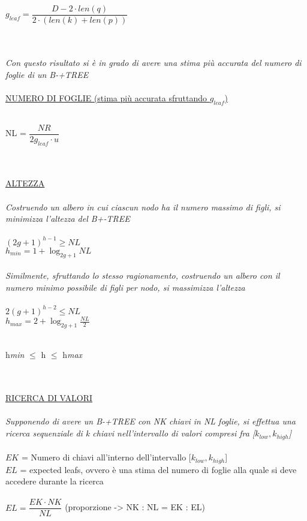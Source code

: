 \documentclass[a4paper,12pt]{article}
\begin{document}
\begin{titlepage}
	\centerline{{\Large ${ g_{leaf} = \dfrac{D - 2 \cdot len(q)}{2 \cdot (len(k) + len(p))}}$}} \\ \\
	\textit{Con questo risultato si è in grado di avere una stima più accurata del numero di foglie di un B-+TREE} \\ \\
	\underline{NUMERO DI FOGLIE (stima più accurata sfruttando ${g_{leaf}}$)} \\ \\
	\centerline{{\Large NL = ${\dfrac{NR}{2g_{leaf} \cdot u}}$}} \\ \\
	\underline{ALTEZZA} \\ \\
	\textit{Costruendo un albero in cui ciascun nodo ha il numero massimo di figli, si minimizza l'altezza del B+-TREE} \\ \\
	${(2g + 1)^{h - 1} \ge NL}$ \\
	${h_{min} = 1 + \log_{2g+1}NL}$ \\ \\
	\textit{Similmente, sfruttando lo stesso ragionamento, costruendo un albero con il numero minimo possibile di figli per nodo, si massimizza l'altezza} \\ \\
	${2(g + 1)^{h - 2} \leq NL}$ \\ 
	${h_{max} = 2 + \log_{2g+1}\tfrac{NL}{2}}$ \\ \\
	\centerline{{\Large h\textit{min} ${\leq}$ h ${\leq}$ h\textit{max}}} \\ \\
	\underline{RICERCA DI VALORI} \\ \\
	\textit{Supponendo di avere un B-+TREE con NK chiavi in NL foglie, si effettua una ricerca sequenziale di k chiavi nell'intervallo di valori compresi fra [${k_{low}, k_{high}}$]} \\ \\
	${EK}$ = Numero di chiavi all'interno dell'intervallo [${k_{low}, k_{high}}$] \\
	${EL}$ = expected leafs, ovvero è una stima del numero di foglie alla quale si deve accedere durante la ricerca \\ \\
	${EL = \dfrac{EK \cdot NK}{NL}}$ (proporzione -> NK : NL = EK : EL) \\ \\

\end{titlepage}
\end{document}
